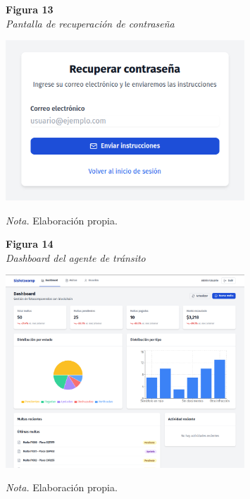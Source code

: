 \begin{figure}[htbp]
    \begin{flushleft}
        \textbf{Figura 13}\\
        \textit{Pantalla de recuperación de contraseña}
    \end{flushleft}
    \centering
    \includegraphics[width=0.8\textwidth]{Images/UI2.png}
    \vspace{0.5em}
    \begin{flushleft}
        \textit{Nota.} Elaboración propia.
    \end{flushleft}
    \label{fig:recuperar_password}
\end{figure}

\begin{figure}[htbp]
    \begin{flushleft}
        \textbf{Figura 14}\\
        \textit{Dashboard del agente de tránsito}
    \end{flushleft}
    \centering
    \includegraphics[width=0.8\textwidth]{Images/UI3.png}
    \vspace{0.5em}
    \begin{flushleft}
        \textit{Nota.} Elaboración propia.
    \end{flushleft}
    \label{fig:dashboard_agente}
\end{figure}

